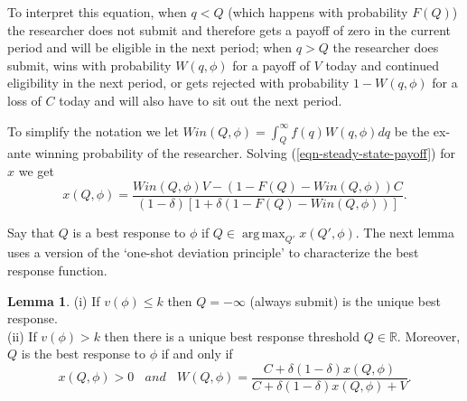 \documentclass[12pt]{article}
\theoremstyle{plain}
\theoremstyle{definition}
\newtheorem{lemma}{Lemma}
\newtheorem{remark}{Remark}
\theoremstyle{remark}
\def\RR{\mathbb{R}}
\DeclareMathOperator*{\argmax}{arg\,max}
\begin{document}
To interpret this equation, when $q<Q$ (which happens with probability $F(Q)$) the researcher does not submit and therefore gets a payoff of zero in the current period and will be eligible in the next period; when $q>Q$ the researcher does submit, wins with probability $W(q,\phi)$ for a payoff of $V$ today and continued eligibility in the next period, or gets rejected with probability $1-W(q,\phi)$ for a loss of $C$ today and will also have to sit out the next period.  

To simplify the notation we let $Win(Q,\phi) = \int_Q^{\infty} f(q)W(q,\phi)dq$ be the ex-ante winning probability of the researcher. 
Solving (\ref{eqn-steady-state-payoff}) for $x$ we get 
\begin{equation}\label{eqn-steady-state-payoff2}
x(Q,\phi) =\frac{Win(Q,\phi)V-(1-F(Q)-Win(Q,\phi))C}{(1-\delta)[1 + \delta(1-F(Q)-Win(Q,\phi))]}.
\end{equation}



Say that $Q$ is a best response to $\phi$ if $Q\in \argmax_{Q'} x(Q',\phi)$. The next lemma uses a version of the `one-shot deviation principle' to characterize the best response function.

\begin{lemma}\label{lemma-best-response}
(i) If $v(\phi)\le k$ then $Q=-\infty$ (always submit) is the unique best response.\\
(ii) If $v(\phi)> k$ then there is a unique best response threshold $Q\in \RR$. Moreover, $Q$ is the best response to $\phi$ if and only if 
    \begin{equation}\label{eqn-best-response}
       x(Q,\phi)> 0 ~~~~\textit{and}~~~~ W(Q,\phi)= \frac{C+\delta(1-\delta)x(Q,\phi)}{C+\delta(1-\delta)x(Q,\phi)+V}.
    \end{equation}
\end{lemma}
\end{document}
